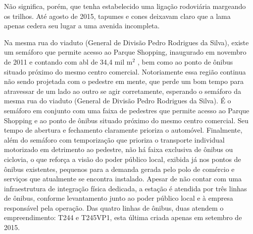 	Não significa, porém, que tenha estabelecido uma ligação rodoviária margeando os trilhos. Até agosto de 2015, tapumes e cones deixavam claro que a lama apenas cedera seu lugar a uma avenida incompleta.
	
	Na mesma rua do viaduto (General de Divisão Pedro Rodrigues da Silva), existe um semáforo que permite acesso ao Parque Shopping, inaugurado em novembro de 2011 e contando com \gls{abl} de 34,4 mil m$^2$ \cite{valoreconomico}, bem como ao ponto de ônibus situado próximo do mesmo centro comercial. Notoriamente essa região continua não sendo projetada com o pedestre em mente, que perde um bom tempo para atravessar de um lado ao outro se agir corretamente, esperando o semáforo da mesma rua do viaduto (General de Divisão Pedro Rodrigues da Silva). É o semáforo em conjunto com uma faixa de pedestres que permite acesso ao Parque Shopping e ao ponto de ônibus situado próximo do mesmo centro comercial. Seu tempo de abertura e fechamento claramente prioriza o automóvel. Finalmente, além do semáforo com temporização que prioriza o transporte individual motorizado em detrimento ao pedestre, não há faixa exclusiva de ônibus ou ciclovia, o que reforça a visão do poder público local, exibida já nos pontos de ônibus existentes, pequenos para a demanda gerada pelo polo de comércio e serviços que atualmente se encontra instalado. 	Apesar de não contar com uma infraestrutura de integração física dedicada, a estação é atendida por três linhas de ônibus, conforme levantamento junto ao poder público local e à empresa responsável pela operação. Das quatro linhas de ônibus, duas atendem o empreendimento: T244 e T245VP1, esta última criada apenas em setembro de 2015\cite{visao}.

